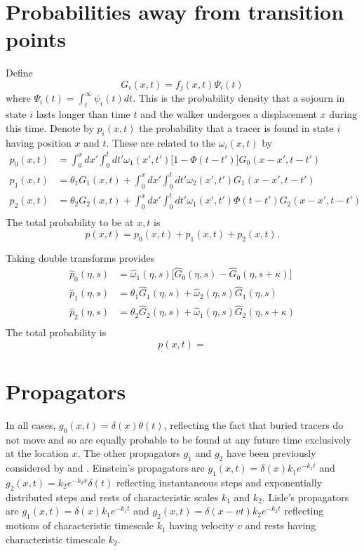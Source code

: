 \documentclass[11pt]{article}
\newcommand\be{\begin{equation}} %
\newcommand\ee{\end{equation}}   %
\begin{document}
\section{Probabilities away from transition points}
Define 
\be G_i(x,t) = f_j(x,t)\Psi_i(t)\ee
where $\Psi_i(t) = \int_t^\infty \psi_i(t)dt$.
This is the probability density that a sojourn in state $i$ lasts longer than time $t$ and the walker undergoes a displacement $x$ during this time.
Denote by $p_i(x,t)$ the probability that a tracer is found in state $i$ having position $x$ and $t$. These are related to the $\omega_i(x,t)$ by 
\begin{align}
p_0(x,t) &= \int_0^x dx' \int_0^t dt' \omega_1(x',t')\big[1-\Phi(t-t')\big]G_0(x-x',t-t')\\
 p_1(x,t) &= \theta_1 G_1(x,t) +\int_0^x dx' \int_0^t dt' \omega_2(x',t') G_1(x-x',t-t') \\
 p_2(x,t) &= \theta_2 G_2(x,t) +\int_0^x dx' \int_0^t dt' \omega_1(x',t')\Phi(t-t')G_2(x-x',t-t') \\
\end{align}
The total probability to be at $x,t$ is 
\be p(x,t) = p_0(x,t) + p_1(x,t) + p_2(x,t). \ee

Taking double transforms provides
\begin{align}
\hat{p}_0(\eta,s) &= \hat{\omega}_1(\eta,s)\big[\hat{G}_0(\eta,s) - \hat{G}_0(\eta,s+\kappa)\big] \\
\hat{p}_1(\eta,s) &= \theta_1 \hat{G}_1(\eta,s) + \hat{\omega}_2(\eta,s)\hat{G}_1(\eta,s)\\
\hat{p}_2(\eta,s) &= \theta_2 \hat{G}_2(\eta,s) + \hat{\omega}_1(\eta,s)\hat{G}_2(\eta,s+\kappa)\\
\end{align}
The total probability is
\be p(x,t) = \ee






\section{Propagators}
In all cases, $g_0(x,t) = \delta(x)\theta(t)$, reflecting the fact that buried tracers do not move and so are equally probable to be found at any future time exclusively at the location $x$.
The other propagators $g_1$ and $g_2$ have been previously considered by \citet{Einstein1937} and \citet{Lisle1998}.
Einstein's propagators are $g_1(x,t) = \delta(x)k_1e^{-k_1t}$ and $g_2(x,t) = k_2e^{-k_2 x}\delta(t)$ reflecting instantaneous steps and exponentially distributed steps and rests of characteristic scales $k_1$ and $k_2$.
Lisle's propagators are $g_1(x,t) = \delta(x)k_1e^{-k_1t}$ and $g_2(x,t) = \delta(x-vt)k_2e^{-k_2t}$ reflecting motions of characteristic timescale $k_1$ having velocity $v$ and rests having characteristic timescale $k_2$.
\end{document}
